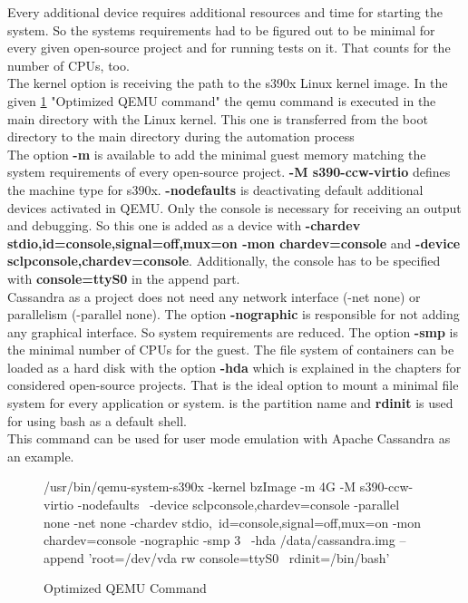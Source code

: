 Every additional device requires additional resources and time for starting the system. 
So the systems requirements had to be figured out to be minimal for every given open-source project and for running tests on it. 
That counts for the number of CPUs, too. \\

The kernel option is receiving the path to the s390x Linux kernel image. In the given \ref{\gls{QEMU}-Command} "Optimized \gls{QEMU} command" the qemu command is executed in the main directory with the Linux kernel. This one is transferred from the boot directory to the main directory during the automation process \\  
The option \textbf{-m} is available to add the minimal guest memory matching the system requirements of every open-source project. \textbf{-M s390-ccw-virtio} defines the machine type for s390x.
\textbf{-nodefaults} is deactivating default additional devices activated in \gls{QEMU}. 
Only the console is necessary for receiving an output and debugging. 
So this one is added as a device with \textbf{-chardev stdio,id=console,signal=off,mux=on -mon chardev=console} and \textbf{-device sclpconsole,chardev=console}. Additionally, the console has to be specified with \textbf{console=ttyS0} in the append part. \\ 
Cassandra as a project does not need any network interface (-net none) or parallelism (-parallel none). The option \textbf{-nographic} is responsible for not adding any graphical interface. 
So system requirements are reduced. The option \textbf{-smp} is the minimal number of CPUs for the guest. 
The file system of containers can be loaded as a hard disk with the option \textbf{-hda} which is explained in the chapters for considered open-source projects. 
That is the ideal option to mount a minimal file system for every application or system. 
 is the partition name and \textbf{rdinit} is used for using bash as a default shell. \\
This command can be used for user mode emulation with Apache Cassandra as an example.


\begin{figure}[H]
\centering
\begin{boxedverbatim}
/usr/bin/qemu-system-s390x -kernel bzImage -m 4G -M s390-ccw-virtio -nodefaults \
-device sclpconsole,chardev=console -parallel none -net none -chardev stdio,\
id=console,signal=off,mux=on -mon chardev=console -nographic -smp 3 \
-hda /data/cassandra.img  --append 'root=/dev/vda rw console=ttyS0 \
rdinit=/bin/bash'
\end{boxedverbatim}
 \caption{Optimized \gls{QEMU} Command}
    \label{\gls{QEMU}-Command}
\end{figure}


